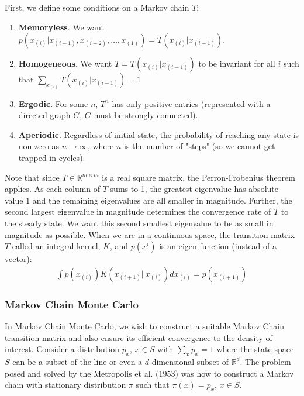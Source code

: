 \documentclass[paper=a4, fontsize=12pt]{scrartcl} %
\numberwithin{equation}{section} %
\numberwithin{figure}{section} %
\numberwithin{table}{section} %
\begin{document}
First, we define some conditions on a Markov chain $T$:
\begin{enumerate}
    \item \textbf{Memoryless}. We want $p(x_{(i)}|x_{(i-1)}, x_{(i-2)}, \ldots, x_{(1)}) = T(x_{(i)}|x_{(i-1)})$.
    \item \textbf{Homogeneous}. We want $T = T(x_{(i)} | x_{(i-1)})$ to be invariant for all $i$ such that $\sum_{x_{(i)}}T(x_{(i)}|x_{(i-1)}) = 1$
    \item \textbf{Ergodic}. For some $n$, $T^n$ has only positive entries (represented with a directed graph $G$, $G$ must be strongly connected).
    \item \textbf{Aperiodic}. Regardless of initial state, the probability of reaching any state is non-zero as $n \rightarrow \infty$, where $n$ is the number of "steps" (so we cannot get trapped in cycles).
\end{enumerate}
Note that since $T \in \mathbb{R}^{m \times m}$ is a real square matrix, the Perron-Frobenius theorem applies. 
As each column of $T$ sums to 1, the greatest eigenvalue has absolute value $1$ and the remaining eigenvalues 
are all smaller in magnitude. Further, the second largest eigenvalue in magnitude determines 
the convergence rate of $T$ to the steady state. We want this second smallest eigenvalue to be as small in 
magnitude as possible. When we are in a continuous space, the transition matrix $T$ called an integral kernel, $K$, 
and $p(x^i)$ is an eigen-function (instead of a vector):
\begin{align*}
    \int p(x_{(i)})K(x_{(i+1)}|\ x_{(i)})dx_{(i)} = p(x_{(i+1)})
\end{align*}

\subsubsection{Markov Chain Monte Carlo}

In Markov Chain Monte Carlo, we wish to construct a suitable Markov Chain transition matrix and also ensure its efficient convergence to the density of 
interest. Consider a distribution $p_x$, $x \in S$ with $\sum_x p_x =1 $ where the state space $S$ can be a subset of the line or even a 
$d$-dimensional subset of $\mathbb{R}^d$. The problem posed and solved by the Metropolis et al. (1953) was how 
to construct a Markov chain with stationary distribution $\pi$ such that $\pi(x) = p_x$, $x \in S$.
\end{document}

